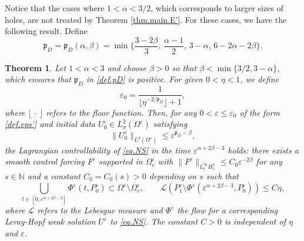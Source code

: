 \documentclass[11pt,a4paper]{article}
\numberwithin{equation}{section}
\newtheorem{theorem}{Theorem}[section]
\newcommand{\N}{\mathbb{N}}
\newcommand{\eps}{\varepsilon}
\begin{document}
Notice that the cases where $1 < \alpha < 3/2$, which corresponds to larger sizes of holes, are not treated by Theorem \ref{thm.main.E'}. For these cases, we have the following result. Define
\begin{equation}\label{def.pD}
    \mathfrak p_D 
    = \mathfrak p_D(\alpha,\beta)
    = \min\Big\{\frac{3-2\beta}{3},\, \frac{\alpha-1}{2},\, 3-\alpha,\, 6-2\alpha-2\beta\Big\}. 
\end{equation}


\begin{theorem}\label{thm.main.D}
Let $1<\alpha<3$ and choose $\beta>0$ so that $\beta<\min\{3/2,3-\alpha\}$, which ensures that $\mathfrak p_D$ in \eqref{def.pD} is positive. For given $0<\eta<1$, we define 
\begin{equation}\label{def.eps_D}
    \eps_0 = \frac{1}{\lfloor \eta^{-2/{\mathfrak p}_D} \rfloor+1}, 
\end{equation}
where $\lfloor\,\cdot\,\rfloor$ refers to the floor function. Then, for any $0 < \eps \le \eps_0$ of the form \eqref{def.eps'} and initial data $U^\eps_0\in L^2_\sigma(\Omega^\eps)$ satisfying
\begin{equation}\label{est1.thm.main.D}
    \|U^\eps_0\|_{L^2(\Omega^\eps)}
    \le
    \eps^{\mathfrak p_D - \beta}, 
\end{equation}
the Lagrangian controllability of \eqref{eq.NS} in the time $\eps^{\alpha+2\beta-3}$ holds: there exists a smooth control forcing $F^\eps$ supported in $\Omega_c^\eps$ with $\|F^\eps\|_{L^{\infty}_t H^s_x} \le C_0 \eps^{-2\beta}$ for any $s\in\N$ 
and a constant $C_0=C_0(s)>0$ depending on $s$
such that 
\begin{equation}\label{est2.thm.main.D}
   \bigcup_{t\in [0,\eps^{\alpha+2\beta-3}]} \Phi^\eps(t,P_0^\eps) \subset\Omega^\eps\setminus\overline{\Omega_{c}^\eps}, \qquad 
    \mathcal{L}(P_1^\eps \setminus \Phi^\eps(\eps^{\alpha+2\beta-3}, P_0^\eps)) 
    \le C \eta, 
\end{equation}
where $\mathcal{L}$ refers to the Lebesgue measure and $\Phi^\eps$ the flow for a corresponding Leray-Hopf weak solution $U^\eps$ to \eqref{eq.NS}. The constant $C>0$ is independent of $\eta$ and $\eps$. 
\end{theorem}
\end{document}
